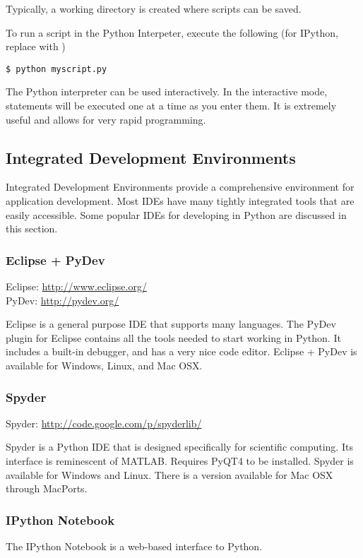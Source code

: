Typically, a working directory is created where scripts can be saved.

To run a script in the Python Interpeter, execute the following (for IPython, replace  with )
\begin{verbatim}
$ python myscript.py
\end{verbatim}

The Python interpreter can be used interactively.  In the interactive mode, statements will be executed one at a time as you enter them.  It is extremely useful and allows for very rapid programming.

\subsection*{Integrated Development Environments}
Integrated Development Environments provide a comprehensive environment for application development.  Most IDEs have many tightly integrated tools that are easily accessible.  Some popular IDEs for developing in Python are discussed in this section.

\subsubsection*{Eclipse + PyDev}

Eclipse: \url{http://www.eclipse.org/} \\
PyDev: \url{http://pydev.org/}

Eclipse is a general purpose IDE that supports many languages.  The PyDev plugin for Eclipse contains all the tools needed to start working in Python.  It includes a built-in debugger, and has a very nice code editor.  Eclipse + PyDev is available for Windows, Linux, and Mac OSX.

\subsubsection*{Spyder}

Spyder: \url{http://code.google.com/p/spyderlib/}

Spyder is a Python IDE that is designed specifically for scientific computing.  Its interface is reminescent of MATLAB.  Requires PyQT4 to be installed.  Spyder is available for Windows and Linux.  There is a version available for Mac OSX through MacPorts.

\subsubsection*{IPython Notebook}
The IPython Notebook is a web-based interface to Python.


